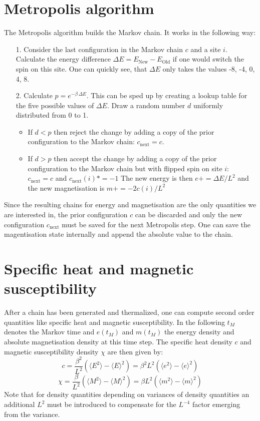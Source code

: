 \documentclass[11pt, a4paper]{scrartcl}
\begin{document}
\section{Metropolis algorithm}
The Metropolis algorithm builds the Markov chain. It works in the following way:
\begin{itemize}
\item[1. ] Consider the last configuration in the Markov chain $c$ and a site $i$. Calculate the energy difference $\Delta E = E_{\mathrm{New}} - E_{\mathrm{Old}}$ if one would switch the spin on this site. One can quickly see, that $\Delta E$ only takes the values -8, -4, 0, 4, 8.
\item[2. ] Calculate $p = e^{- \beta\,\Delta E}$. This can be sped up by creating a lookup table for the five possible values of $\Delta E$. Draw a random number $d$ uniformly distributed from 0 to 1.
    \begin{itemize}
    \item If $d < p$ then reject the change by adding a copy of the prior configuration to the Markov chain: $c_{\mathrm{next}} = c$.
    \item If $d > p$ then accept the change by adding a copy of the prior configuration to the Markov chain but with flipped spin on site $i$: $c_{\mathrm{next}} = c$ and $c_{\mathrm{next}}(i) *= -1$ The new energy is then $e += \Delta E/L^2$ and the new magnetisation is $m += -2c(i)/L^2$
    \end{itemize}
\end{itemize}
Since the resulting chains for energy and magnetisation are the only quantities we are interested in, the prior configuration $c$ can be discarded and only the new configuration $c_{\mathrm{next}}$ must be saved for the next Metropolis step. One can save the magentisation state internally and append the absolute value to the chain.

\section{Specific heat and magnetic susceptibility}
After a chain has been generated and thermalized, one can compute second order quantities like specific heat and magnetic susceptibility. In the following $t_M$ denotes the Markov time and $e(t_M)$ and $m(t_M)$ the energy density and absolute magnetisation density at this time step. The specific heat density $c$ and magnetic susceptibility density $\chi$ are then given by:
$$
c = \frac{\beta ^ 2}{L^2} (\langle E^2 \rangle - \langle E \rangle ^ 2) = \beta ^ 2 L^2 (\langle e^2 \rangle - \langle e \rangle ^ 2)
$$
$$
\chi = \frac{\beta}{L^2} (\langle M^2 \rangle - \langle M \rangle ^ 2) = \beta L^2 (\langle m^2 \rangle - \langle m \rangle ^ 2)
$$
Note that for density quantities depending on variances of density quantities an additional $L^2$ must be introduced to compensate for the $L^{-4}$ factor emerging from the variance.
\end{document}
